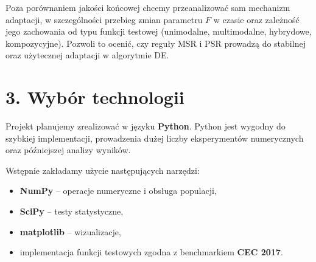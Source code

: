 \documentclass[11pt,a4paper]{article}
\begin{document}
Poza porównaniem jakości końcowej chcemy przeanalizować sam mechanizm adaptacji, w szczególności przebieg zmian parametru $F$ w czasie oraz zależność jego zachowania od typu funkcji testowej (unimodalne, multimodalne, hybrydowe, kompozycyjne). Pozwoli to ocenić, czy reguły MSR i PSR prowadzą do stabilnej oraz użytecznej adaptacji w algorytmie DE.

\section*{3. Wybór technologii}

Projekt planujemy zrealizować w języku \textbf{Python}. Python jest wygodny do szybkiej implementacji, prowadzenia dużej liczby eksperymentów numerycznych oraz późniejszej analizy wyników.

Wstępnie zakładamy użycie następujących narzędzi:
\begin{itemize}
    \item \textbf{NumPy} -- operacje numeryczne i obsługa populacji,
    \item \textbf{SciPy} -- testy statystyczne,
    \item \textbf{matplotlib} -- wizualizacje,
    \item implementacja funkcji testowych zgodna z benchmarkiem \textbf{CEC 2017}.
\end{itemize}
\end{document}
